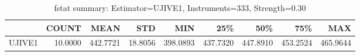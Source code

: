 \begin{table}[ht]
\centering
\caption{fstat summary: Estimator=UJIVE1, Instruments=333, Strength=0.30}
\begin{tabular}{lrrrrrrrr}
\toprule
 & COUNT & MEAN & STD & MIN & 25\% & 50\% & 75\% & MAX \\
\midrule
UJIVE1 & 10.0000 & 442.7721 & 18.8056 & 398.0893 & 437.7320 & 447.8910 & 453.2524 & 465.9644 \\
\bottomrule
\end{tabular}
\end{table}
